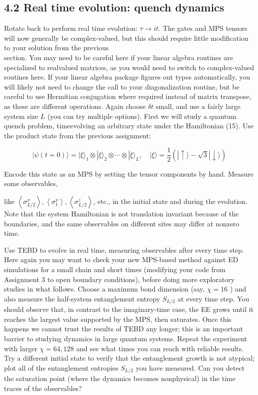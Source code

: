 \documentclass[12pt]{article}
\begin{document}
\subsection*{4.2 Real time evolution: quench dynamics}
Rotate back to perform real time evolution: $\tau \rightarrow i t$. The gates and MPS tensors will now generally be complex-valued, but this should require little modification to your solution from the previous\\
section. You may need to be careful here if your linear algebra routines are specialized to realvalued matrices, as you would need to switch to complex-valued routines here. If your linear algebra package figures out types automatically, you will likely not need to change the call to your diagonalization routine, but be careful to use Hermitian conjugation where required instead of matrix transpose, as these are different operations. Again choose $\delta t$ small, and use a fairly large system size $L$ (you can try multiple options). First we will study a quantum quench problem, timeevolving an arbitrary state under the Hamiltonian (15). Use the product state from the previous assignment:


\begin{equation*}
|\psi(t=0)\rangle=|\xi\rangle_{1} \otimes|\xi\rangle_{2} \otimes \cdots \otimes|\xi\rangle_{L}, \quad|\xi\rangle=\frac{1}{2}(|\uparrow\rangle-\sqrt{3}|\downarrow\rangle) \tag{23}
\end{equation*}


Encode this state as an MPS by setting the tensor components by hand. Measure some observables,

like $\left\langle\sigma_{L / 2}^{x}\right\rangle,\left\langle\sigma_{1}^{x}\right\rangle,\left\langle\sigma_{L / 2}^{z}\right\rangle$, etc., in the initial state and during the evolution. Note that the system Hamiltonian is not translation invariant because of the boundaries, and the same observables on different sites may differ at nonzero time.

Use TEBD to evolve in real time, measuring observables after every time step. Here again you may want to check your new MPS-based method against ED simulations for a small chain and short times (modifying your code from Assignment 3 to open boundary conditions), before doing more exploratory studies in what follows. Choose a maximum bond dimension (say, $\chi=16$ ) and also measure the half-system entanglement entropy $S_{L / 2}$ at every time step. You should observe that, in contrast to the imaginary-time case, the EE grows until it reaches the largest value supported by the MPS, then saturates. Once this happens we cannot trust the results of TEBD any longer; this is an important barrier to studying dynamics in large quantum systems. Repeat the experiment with larger $\chi=64,128$ and see what times you can reach with reliable results. Try a different initial state to verify that the entanglement growth is not atypical; plot all of the entanglement entropies $S_{L / 2}$ you have measured. Can you detect the saturation point (where the dynamics becomes nonphysical) in the time traces of the observables?
\end{document}
